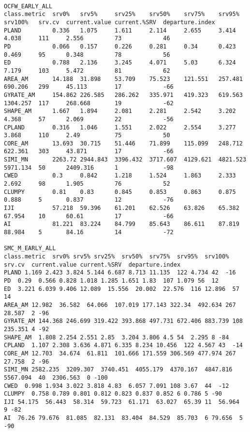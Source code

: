 \begin{verbatim}

OCFW_EARLY_ALL                      
class.metric  srv0%   srv5%     srv25%    srv50%    srv75%    srv95%    srv100%   srv.cv  current.value current.%SRV  departure.index
PLAND         0.336   1.075     1.611     2.114     2.655     3.414     4.038     111     2.556         73            46
PD            0.066   0.157     0.226     0.281     0.34      0.423     0.469     95      0.348         78            56
ED            0.788   2.136     3.245     4.071     5.03      6.324     7.179     103     5.472         81            62
AREA_AM       14.188  31.898    53.709    75.523    121.551   257.481   690.206   299     45.113        17            -66
GYRATE_AM     154.862 226.585   286.262   335.971   419.323   619.563   1304.257  117     268.668       19            -62
SHAPE_AM      1.667   1.894     2.081     2.281     2.542     3.202     4.368     57      2.069         22            -56
CPLAND        0.316   1.046     1.551     2.022     2.554     3.277     3.868     110     2.49          75            50
CORE_AM       13.693  30.715    51.446    71.899    115.099   248.712   622.361   303     43.871        17            -66
SIMI_MN       2263.72 2944.843  3396.432  3717.607  4129.621  4821.523  5971.134  50      2409.316      1             -98
CWED          0.3     0.842     1.218     1.524     1.863     2.333     2.692     98      1.905         76            52
CLUMPY        0.81    0.83      0.845     0.853     0.863     0.875     0.888     5       0.837         12            -76
IJI           57.218  59.396    61.201    62.526    63.826    65.382    67.954    10      60.61         17            -66
AI            81.221  83.224    84.799    85.643    86.611    87.819    88.984    5       84.16         14            -72
                      
SMC_M_EARLY_ALL                     
class.metric  srv0% srv5% srv25%  srv50%  srv75%  srv95%  srv100% srv.cv  current.value current.%SRV  departure.index
PLAND 1.169 2.423 3.824 5.144 6.687 8.713 11.135  122 4.734 42  -16
PD  0.29  0.566 0.828 1.018 1.285 1.651 1.83  107 1.079 56  12
ED  3.221 6.039 9.406 12.089  15.556  20.002  22.576  116 12.896  57  14
AREA_AM 12.982  36.582  64.066  107.019 177.143 322.34  492.634 267 28.587  2 -96
GYRATE_AM 144.368 246.699 319.422 393.868 497.731 672.406 883.739 108 235.351 4 -92
SHAPE_AM  1.808 2.254 2.551 2.85  3.204 3.806 4.5 54  2.295 8 -84
CPLAND  1.107 2.308 3.636 4.871 6.335 8.234 10.456  122 4.567 43  -14
CORE_AM 12.703  34.674  61.811  101.666 171.559 306.569 477.974 267 27.758  2 -96
SIMI_MN 2582.235  3209.307  3740.451  4055.179  4370.167  4847.816  5567.094  40  2306.563  0 -100
CWED  0.998 1.934 3.022 3.818 4.83  6.057 7.091 108 3.67  44  -12
CLUMPY  0.758 0.789 0.801 0.812 0.823 0.837 0.852 6 0.786 5 -90
IJI 54.175  56.443  58.314  59.723  61.171  63.027  65.39 11  56.964  9 -82
AI  76.26 79.676  81.085  82.131  83.404  84.529  85.703  6 79.656  5 -90
                      

\end{verbatim}
